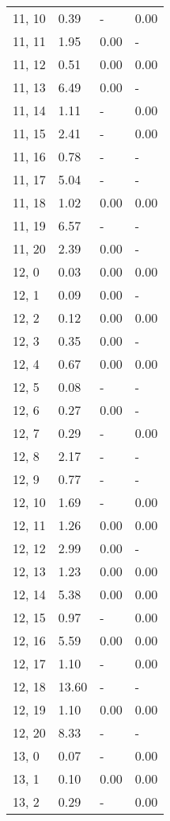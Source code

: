 \begin{table}
\begin{tabular}{llll}
11, 10 &    0.39 &     - &  0.00 \\
11, 11 &    1.95 &  0.00 &     - \\
11, 12 &    0.51 &  0.00 &  0.00 \\
11, 13 &    6.49 &  0.00 &     - \\
11, 14 &    1.11 &     - &  0.00 \\
11, 15 &    2.41 &     - &  0.00 \\
11, 16 &    0.78 &     - &     - \\
11, 17 &    5.04 &     - &     - \\
11, 18 &    1.02 &  0.00 &  0.00 \\
11, 19 &    6.57 &     - &     - \\
11, 20 &    2.39 &  0.00 &     - \\
12, 0  &    0.03 &  0.00 &  0.00 \\
12, 1  &    0.09 &  0.00 &     - \\
12, 2  &    0.12 &  0.00 &  0.00 \\
12, 3  &    0.35 &  0.00 &     - \\
12, 4  &    0.67 &  0.00 &  0.00 \\
12, 5  &    0.08 &     - &     - \\
12, 6  &    0.27 &  0.00 &     - \\
12, 7  &    0.29 &     - &  0.00 \\
12, 8  &    2.17 &     - &     - \\
12, 9  &    0.77 &     - &     - \\
12, 10 &    1.69 &     - &  0.00 \\
12, 11 &    1.26 &  0.00 &  0.00 \\
12, 12 &    2.99 &  0.00 &     - \\
12, 13 &    1.23 &  0.00 &  0.00 \\
12, 14 &    5.38 &  0.00 &  0.00 \\
12, 15 &    0.97 &     - &  0.00 \\
12, 16 &    5.59 &  0.00 &  0.00 \\
12, 17 &    1.10 &     - &  0.00 \\
12, 18 &   13.60 &     - &     - \\
12, 19 &    1.10 &  0.00 &  0.00 \\
12, 20 &    8.33 &     - &     - \\
13, 0  &    0.07 &     - &  0.00 \\
13, 1  &    0.10 &  0.00 &  0.00 \\
13, 2  &    0.29 &     - &  0.00 \\

\end{tabular}
\end{table}
